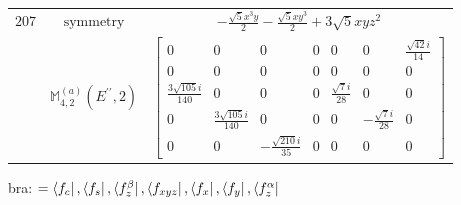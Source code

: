 \documentclass[fleqn,8pt,landscape]{jsarticle}
\begin{document}
\begin{longtable}{ccc}
$ 207 $ & $ \text{symmetry} $ & $ - \frac{\sqrt{5} x^{3} y}{2} - \frac{\sqrt{5} x y^{3}}{2} + 3 \sqrt{5} x y z^{2} $ \\
$  $ & $ \mathbb{M}_{4,2}^{(a)}(E^{\prime\prime},2) $ & $ \begin{bmatrix} 0 & 0 & 0 & 0 & 0 & 0 & \frac{\sqrt{42} i}{14} \\ 0 & 0 & 0 & 0 & 0 & 0 & 0 \\ \frac{3 \sqrt{105} i}{140} & 0 & 0 & 0 & \frac{\sqrt{7} i}{28} & 0 & 0 \\ 0 & \frac{3 \sqrt{105} i}{140} & 0 & 0 & 0 & - \frac{\sqrt{7} i}{28} & 0 \\ 0 & 0 & - \frac{\sqrt{210} i}{35} & 0 & 0 & 0 & 0 \end{bmatrix} $ \\ \hline
\end{longtable}
bra: $=\bra{f_{c}}, \bra{f_{s}}, \bra{f_{z}^{\beta}}, \bra{f_{xyz}}, \bra{f_{x}}, \bra{f_{y}}, \bra{f_{z}^{\alpha}}$
\end{document}
